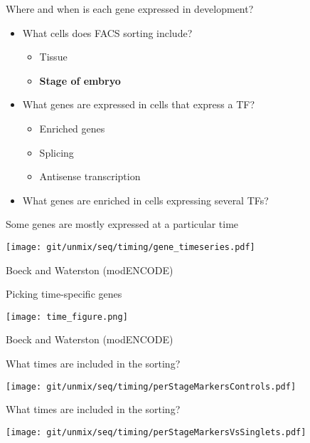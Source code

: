 \documentclass[serif,9pt]{beamer}
\begin{document}
\begin{frame}{Where and when is each gene expressed in development?}
\begin{itemize}
\item What cells does FACS sorting include?
\begin{itemize}
\item Tissue
\item {\bf Stage of embryo}
\end{itemize}
\item What genes are expressed in cells that express a TF?
\begin{itemize}
\item Enriched genes
\item Splicing
\item Antisense transcription
\end{itemize}
\item What genes are enriched in cells expressing several TFs?
\end{itemize}
\end{frame}

\begin{frame}{Some genes are mostly expressed at a particular time}

\texttt{[image: git/unmix/seq/timing/gene\_timeseries.pdf]}

\hfill Boeck and Waterston (modENCODE)

\end{frame}

\begin{frame}{Picking time-specific genes}

\texttt{[image: time\_figure.png]}

\hfill Boeck and Waterston (modENCODE)

\end{frame}

\begin{frame}{What times are included in the sorting?}

\begin{centering}
\texttt{[image: git/unmix/seq/timing/perStageMarkersControls.pdf]}
\end{centering}

\end{frame}

\begin{frame}{What times are included in the sorting?}

\begin{centering}
\texttt{[image: git/unmix/seq/timing/perStageMarkersVsSinglets.pdf]}
\end{centering}

\end{frame}
\end{document}
